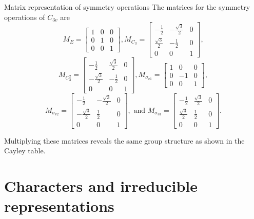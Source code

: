 \documentclass{beamer}
\newcommand{\vs}{\vspace{5mm}}
\begin{document}
    \begin{frame}{Matrix representation of symmetry operations}
        The matrices for the symmetry operations of $C_{3v}$ are \[M_E=\begin{bmatrix}1&0&0\\0&1&0\\0&0&1\end{bmatrix}, M_{C_3}=\begin{bmatrix}-\frac12&-\frac{\sqrt{3}}2&0\\\frac{\sqrt{3}}2&-\frac12&0\\0&0&1\end{bmatrix},\]\[M_{C_3^2}=\begin{bmatrix}-\frac12&\frac{\sqrt{3}}2&0\\-\frac{\sqrt{3}}2&-\frac12&0\\0&0&1\end{bmatrix},M_{\sigma_{v1}}=\begin{bmatrix}1&0&0\\0&-1&0\\0&0&1\end{bmatrix},\]\[M_{\sigma_{v2}}=\begin{bmatrix}-\frac12&-\frac{\sqrt{3}}2&0\\-\frac{\sqrt3}2&\frac12&0\\0&0&1\end{bmatrix}, \text{ and } M_{\sigma_{v3}}=\begin{bmatrix}-\frac12&\frac{\sqrt{3}}2&0\\\frac{\sqrt3}2&\frac12&0\\0&0&1\end{bmatrix}.\]\vs
        
        Multiplying these matrices reveals the same group structure as shown in the Cayley table.
    \end{frame}

    \section{Characters and irreducible representations}
\end{document}
